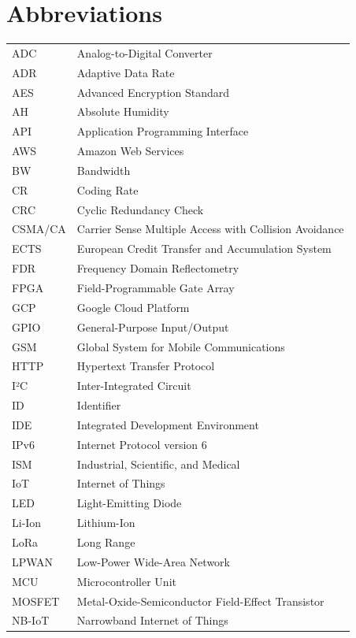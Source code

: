 \chapter*{Abbreviations}
\begingroup
\small
\begin{longtable}{@{}p{}p{}@{}}
ADC & Analog-to-Digital Converter\\
ADR & Adaptive Data Rate\\
AES & Advanced Encryption Standard\\
AH & Absolute Humidity\\
API & Application Programming Interface\\
AWS & Amazon Web Services\\
BW & Bandwidth\\
CR & Coding Rate\\
CRC & Cyclic Redundancy Check\\
CSMA/CA & Carrier Sense Multiple Access with Collision Avoidance\\
ECTS & European Credit Transfer and Accumulation System\\
FDR & Frequency Domain Reflectometry\\
FPGA & Field-Programmable Gate Array\\
GCP & Google Cloud Platform\\
GPIO & General-Purpose Input/Output\\
GSM & Global System for Mobile Communications\\
HTTP & Hypertext Transfer Protocol\\
I²C & Inter-Integrated Circuit\\
ID & Identifier\\
IDE & Integrated Development Environment\\
IPv6 & Internet Protocol version 6\\
ISM & Industrial, Scientific, and Medical\\
IoT & Internet of Things\\
LED & Light-Emitting Diode\\
Li-Ion & Lithium-Ion\\
LoRa & Long Range\\
LPWAN & Low-Power Wide-Area Network\\
MCU & Microcontroller Unit\\
MOSFET & Metal-Oxide-Semiconductor Field-Effect Transistor\\
NB-IoT & Narrowband Internet of Things\\

\end{longtable}
